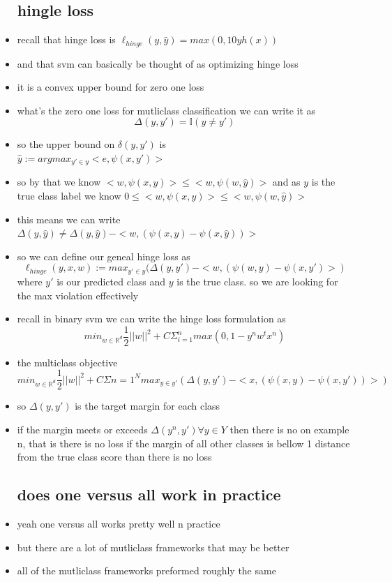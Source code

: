 \documentclass{article}
\begin{document}
\begin{itemize}
\subsection*{hingle loss}
\item recall that hinge loss is $\ell_{hinge}(y,\hat{y})=max(0,10yh(x))$
\item and that svm can basically be thought of as optimizing hinge loss 
\item it is a convex upper bound for zero one loss
\item what's the zero one loss for mutliclass classification we can write it as $$\Delta(y,y')=\mathbb{I}(y\neq y')$$
\item so the upper bound on $\delta(y,y')$ is \\ $\hat{y}:=argmax_{y'\in y}<e,\psi(x,y')>$
\item so by that we know $<w,\psi(x,y)>\leq <w,\psi(w,\hat{y})>$ and as $y$ is the true class label we know $0\leq<w,\psi(x,y)>\leq <w,\psi(w,\hat{y})>$
\item this means we can write $\Delta(y,\hat{y})\neq \Delta(y,\hat{y})-<w,(\psi(x,y)-\psi(x,\hat{y}))>$
\item so we can define our geneal hinge loss as $$\ell_{hinge}(y,x,w):=max_{y'\in y}(\Delta (y,y')-<w,(\psi(w,y)-\psi(x,y')> )$$ where $y'$ is our predicted class and $y$ is the true class. so we are looking for the max violation effectively 
\item recall in binary svm we can write the hinge loss formulation as $$min_{w\in \mathbb{R}^{d}}\frac{1}{2}||w||^{2}+C\Sigma_{i=1}^{n}max(0,1-y^{n}w^{t}x^{n})$$
\item the multiclass objective $$min_{w\in \mathbb{R}^{d}}\frac{1}{2}||w||^{2}+C\Sigma{n=1}^{N}max_{y\in y'}(\Delta(y,y')- <x,(\psi(x,y)-\psi(x,y'))>)$$
\item so $\Delta(y,y')$ is the target margin for each class 
\item if the margin meets or exceeds $\Delta(y^n,y')\forall y\in Y$ then there is no on example n, that is there is no loss if the margin of all other classes is bellow 1 distance from the true class score than there is no loss 
\subsection*{does one versus all work in practice}
\item yeah one versus all works pretty well n practice
\item but there are a lot of mutliclass frameworks that may be better
\item all of the mutliclass frameworks preformed roughly the same 


\end{itemize}
\end{document}
